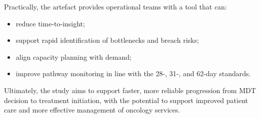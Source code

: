 Practically, the artefact provides operational teams with a tool that can:
\begin{itemize}
    \item reduce time-to-insight;
    \item support rapid identification of bottlenecks and breach risks;
    \item align capacity planning with demand;
    \item improve pathway monitoring in line with the 28-, 31-, and 62-day standards.
\end{itemize}

Ultimately, the study aims to support faster, more reliable progression from MDT decision to treatment initiation, with the potential to support improved patient care and more effective management of oncology services.
